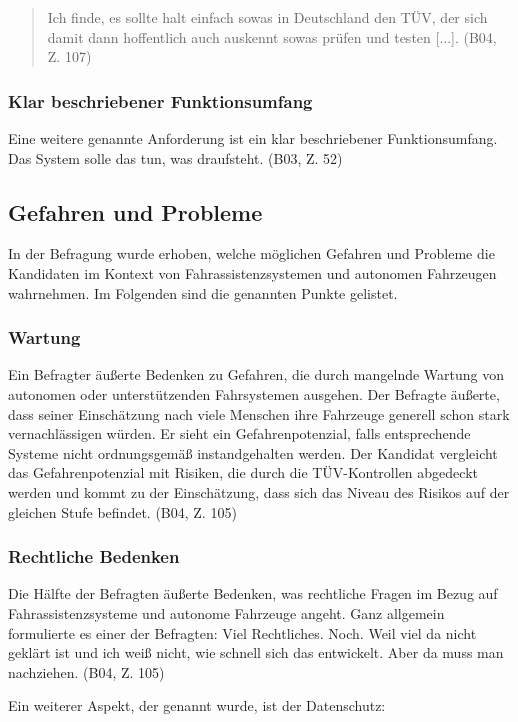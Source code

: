\documentclass[12pt]{article}
\begin{document}
\begin{quote}
  Ich finde, es sollte halt einfach sowas in Deutschland den TÜV, der sich damit dann hoffentlich auch auskennt sowas prüfen und testen [...]. (B04, Z. 107)
\end{quote}

\subsubsection*{Klar beschriebener Funktionsumfang}
Eine weitere genannte Anforderung ist ein klar beschriebener Funktionsumfang. Das System solle \glqq das tun, was draufsteht\grqq{}. (B03, Z. 52)


\subsection{Gefahren und Probleme}
In der Befragung wurde erhoben, welche möglichen Gefahren und Probleme die Kandidaten im Kontext von Fahrassistenzsystemen und autonomen Fahrzeugen wahrnehmen. Im Folgenden sind die genannten Punkte gelistet.

\subsubsection*{Wartung}
Ein Befragter äußerte Bedenken zu Gefahren, die durch mangelnde Wartung von autonomen oder unterstützenden Fahrsystemen ausgehen. Der Befragte äußerte, dass seiner Einschätzung nach viele Menschen ihre Fahrzeuge generell schon stark vernachlässigen würden. Er sieht ein Gefahrenpotenzial, falls entsprechende Systeme nicht ordnungsgemäß instandgehalten werden. Der Kandidat vergleicht das Gefahrenpotenzial mit Risiken, die durch die TÜV-Kontrollen abgedeckt werden und kommt zu der Einschätzung, dass sich das Niveau des Risikos auf der gleichen Stufe befindet. (B04, Z. 105)

\subsubsection*{Rechtliche Bedenken}
Die Hälfte der Befragten äußerte Bedenken, was rechtliche Fragen im Bezug auf Fahrassistenzsysteme und autonome Fahrzeuge angeht. Ganz allgemein formulierte es einer der Befragten: \glqq Viel Rechtliches. Noch. Weil viel da nicht geklärt ist und ich weiß nicht, wie schnell sich das entwickelt. Aber da muss man nachziehen.\grqq{} (B04, Z. 105)

Ein weiterer Aspekt, der genannt wurde, ist der Datenschutz:
\end{document}
